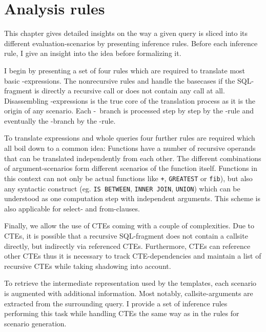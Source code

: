\chapter{Analysis rules}\label{chapter:analysis}


This chapter gives detailed insights on the way a given query is sliced into its different evaluation-scenarios by presenting inference rules. Before each inference rule, I give an insight into the idea before formalizing it.

I begin by presenting a set of four rules which are required to translate most basic \CASE-expressions. The nonrecursive rules \RREC and \RBASE handle the basecases if the SQL-fragment is directly a recursive call or does not contain any call at all. Disassembling \CASE-expressions is the true core of the translation process as it is the origin of any scenario. Each \WHEN-\THEN~branch is processed step by step by the \RWHEN-rule and eventually the \ELSE-branch by the \RELSE-rule.

To translate expressions and whole queries four further rules are required which all boil down to a common idea: Functions have a number of recursive operands that can be translated independently from each other. The different combinations of argument-scenarios form different scenarios of the function itself. Functions in this context can not only be actual functions like \texttt{+}, \texttt{GREATEST} or \texttt{fib}), but also any syntactic construct (eg. \texttt{IS BETWEEN}, \texttt{INNER JOIN}, \texttt{UNION}) which can be understood as one computation step with independent arguments. This scheme is also applicable for select- and from-clauses.

Finally, we allow the use of CTEs coming with a couple of complexities. Due to CTEs, it is possible that a recursive SQL-fragment does not contain a callsite directly, but indirectly via referenced CTEs. Furthermore, CTEs can reference other CTEs thus it is necessary to track CTE-dependencies and maintain a list of recursive CTEs while taking shadowing into account.

To retrieve the intermediate representation used by the templates, each scenario is augmented with additional information. Most notably, callsite-arguments are extracted from the surrounding query. I provide a set of inference rules performing this task while handling CTEs the same way as in the rules for scenario generation.

